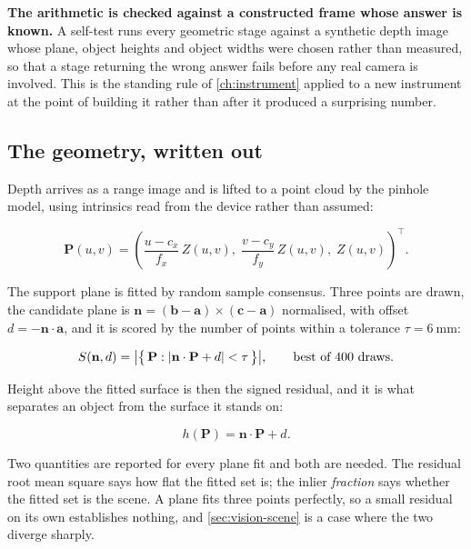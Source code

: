 \textbf{The arithmetic is checked against a constructed frame whose answer is
known.} A self-test runs every geometric stage against a synthetic depth image
whose plane, object heights and object widths were chosen rather than
measured, so that a stage returning the wrong answer fails before any real
camera is involved. This is the standing rule of \cref{ch:instrument} applied
to a new instrument at the point of building it rather than after it produced
a surprising number.

\subsection{The geometry, written out}

Depth arrives as a range image and is lifted to a point cloud by the pinhole
model, using intrinsics read from the device rather than assumed:

\begin{equation}
  \label{eq:deproject}
  \mathbf{P}(u,v) =
  \left(
    \frac{u - c_x}{f_x}\,Z(u,v),\;
    \frac{v - c_y}{f_y}\,Z(u,v),\;
    Z(u,v)
  \right)^{\!\top} .
\end{equation}

The support plane is fitted by random sample consensus. Three points are drawn,
the candidate plane is
$\mathbf{n} = (\mathbf{b}-\mathbf{a}) \times (\mathbf{c}-\mathbf{a})$
normalised, with offset $d = -\mathbf{n}\cdot\mathbf{a}$, and it is scored by
the number of points within a tolerance $\tau = \SI{6}{\milli\metre}$:

\begin{equation}
  \label{eq:ransac}
  S(\mathbf{n}, d) =
  \bigl|\bigl\{\,\mathbf{P} : |\mathbf{n}\cdot\mathbf{P} + d| < \tau \,\bigr\}\bigr| ,
  \qquad
  \text{best of \num{400} draws.}
\end{equation}

Height above the fitted surface is then the signed residual, and it is what
separates an object from the surface it stands on:

\begin{equation}
  \label{eq:height}
  h(\mathbf{P}) = \mathbf{n}\cdot\mathbf{P} + d .
\end{equation}

Two quantities are reported for every plane fit and both are needed. The
residual root mean square says how flat the fitted set is; the inlier
\emph{fraction} says whether the fitted set is the scene. A plane fits three
points perfectly, so a small residual on its own establishes nothing, and
\cref{sec:vision-scene} is a case where the two diverge sharply.

